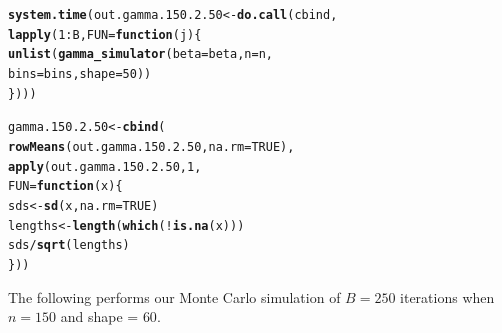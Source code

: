 \documentclass[11pt]{article}\usepackage[]{graphicx}\usepackage[]{color}
\makeatletter
\newcommand{\hlnum}[1]{\textcolor[rgb]{0.686,0.059,0.569}{#1}}%
\newcommand{\hlopt}[1]{\textcolor[rgb]{0,0,0}{#1}}%
\newcommand{\hlstd}[1]{\textcolor[rgb]{0.345,0.345,0.345}{#1}}%
\newcommand{\hlkwa}[1]{\textcolor[rgb]{0.161,0.373,0.58}{\textbf{#1}}}%
\newcommand{\hlkwb}[1]{\textcolor[rgb]{0.69,0.353,0.396}{#1}}%
\newcommand{\hlkwc}[1]{\textcolor[rgb]{0.333,0.667,0.333}{#1}}%
\newcommand{\hlkwd}[1]{\textcolor[rgb]{0.737,0.353,0.396}{\textbf{#1}}}%
\newenvironment{kframe}{%
 \def\at@end@of@kframe{}%
 \ifinner\ifhmode%
  \def\at@end@of@kframe{\end{minipage}}%
  \begin{minipage}{\columnwidth}%
 \fi\fi%
 \def\FrameCommand##1{\hskip\@totalleftmargin \hskip-\fboxsep
 \colorbox{shadecolor}{##1}\hskip-\fboxsep
     \hskip-\linewidth \hskip-\@totalleftmargin \hskip\columnwidth}%
 \MakeFramed {\advance\hsize-\width
   \@totalleftmargin\z@ \linewidth\hsize
   \@setminipage}}%
 {\par\unskip\endMakeFramed%
 \at@end@of@kframe}
\newenvironment{knitrout}{}{} %
\makeatother
\begin{document}
\begin{knitrout}
\color{fgcolor}\begin{kframe}
\begin{alltt}
\hlkwd{system.time}\hlstd{(out.gamma.150.2.50} \hlkwb{<-} \hlkwd{do.call}\hlstd{(cbind,}
  \hlkwd{lapply}\hlstd{(}\hlnum{1}\hlopt{:}\hlstd{B,} \hlkwc{FUN} \hlstd{=} \hlkwa{function}\hlstd{(}\hlkwc{j}\hlstd{)\{}
    \hlkwd{unlist}\hlstd{(}\hlkwd{gamma_simulator}\hlstd{(}\hlkwc{beta} \hlstd{= beta,} \hlkwc{n} \hlstd{= n,}
      \hlkwc{bins} \hlstd{= bins,} \hlkwc{shape} \hlstd{=} \hlnum{50}\hlstd{))}
\hlstd{\})))}
\end{alltt}


{\ttfamily\noindent\bfseries\color{errorcolor}{\#\# Error in eval(family\$initialize): non-positive values not allowed for the 'gamma' family}}

{\ttfamily\noindent\itshape\color{messagecolor}{\#\# Timing stopped at: 0.002 0 0.003}}\end{kframe}
\end{knitrout}

\begin{knitrout}
\color{fgcolor}\begin{kframe}
\begin{alltt}
\hlstd{gamma.150.2.50} \hlkwb{<-} \hlkwd{cbind}\hlstd{(}
  \hlkwd{rowMeans}\hlstd{(out.gamma.150.2.50,} \hlkwc{na.rm} \hlstd{=} \hlnum{TRUE}\hlstd{),}
  \hlkwd{apply}\hlstd{(out.gamma.150.2.50,} \hlnum{1}\hlstd{,}
  \hlkwc{FUN} \hlstd{=} \hlkwa{function}\hlstd{(}\hlkwc{x}\hlstd{)\{}
    \hlstd{sds} \hlkwb{<-} \hlkwd{sd}\hlstd{(x,} \hlkwc{na.rm} \hlstd{=} \hlnum{TRUE}\hlstd{)}
    \hlstd{lengths} \hlkwb{<-} \hlkwd{length}\hlstd{(}\hlkwd{which}\hlstd{(}\hlopt{!}\hlkwd{is.na}\hlstd{(x)))}
    \hlstd{sds} \hlopt{/} \hlkwd{sqrt}\hlstd{(lengths)}
  \hlstd{\}))}
\end{alltt}


{\ttfamily\noindent\bfseries\color{errorcolor}{\#\# Error in is.data.frame(x): object 'out.gamma.150.2.50' not found}}\end{kframe}
\end{knitrout}

The following performs our Monte Carlo simulation of $B = 250$ iterations 
when $n = 150$ and shape = $60$.
\end{document}
